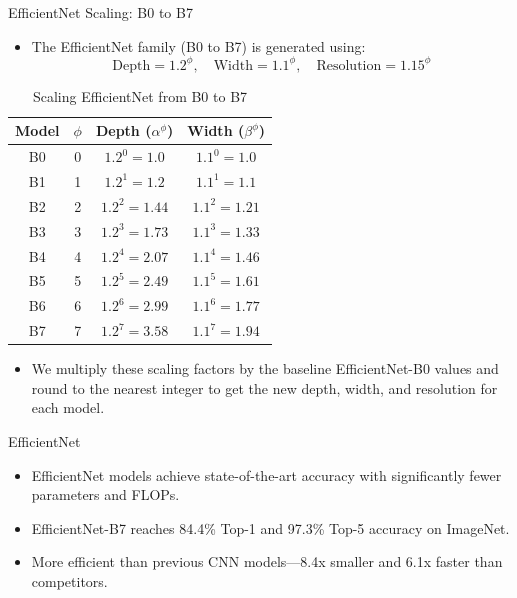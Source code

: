 \documentclass[10pt]{beamer}
\theoremstyle{remark}
\theoremstyle{definition}
\begin{document}
\begin{frame}{EfficientNet Scaling: B0 to B7}
\begin{itemize}
    \item The EfficientNet family (B0 to B7) is generated using:
    \[
    \text{Depth} = 1.2^\phi, \quad
    \text{Width} = 1.1^\phi, \quad
    \text{Resolution} = 1.15^\phi
    \]
\end{itemize}

\begin{table}[]
    \centering
    \begin{tabular}{|c|c|c|c|}
        \hline
        \textbf{Model} & \(\phi\) & \textbf{Depth} (\(\alpha^\phi\)) & \textbf{Width} (\(\beta^\phi\)) \\ 
        \hline
        B0 & 0 & \(1.2^0 = 1.0\) & \(1.1^0 = 1.0\)  \\ 
        B1 & 1 & \(1.2^1 = 1.2\) & \(1.1^1 = 1.1\)  \\ 
        B2 & 2 & \(1.2^2 = 1.44\) & \(1.1^2 = 1.21\)  \\ 
        B3 & 3 & \(1.2^3 = 1.73\) & \(1.1^3 = 1.33\)  \\ 
        B4 & 4 & \(1.2^4 = 2.07\) & \(1.1^4 = 1.46\)  \\ 
        B5 & 5 & \(1.2^5 = 2.49\) & \(1.1^5 = 1.61\)  \\ 
        B6 & 6 & \(1.2^6 = 2.99\) & \(1.1^6 = 1.77\)  \\ 
        B7 & 7 & \(1.2^7 = 3.58\) & \(1.1^7 = 1.94\)  \\ 
        \hline
    \end{tabular}
    \caption{Scaling EfficientNet from B0 to B7}
\end{table}

\begin{itemize}
\item We multiply these scaling factors by the baseline EfficientNet-B0 values and round to the nearest integer to get the new depth, width, and resolution for each model.
\end{itemize}


\end{frame}


\begin{frame}{EfficientNet}

\begin{itemize}
    \item EfficientNet models achieve state-of-the-art accuracy with significantly fewer parameters and FLOPs.        \pause

    \item EfficientNet-B7 reaches 84.4\% Top-1 and 97.3\% Top-5 accuracy on ImageNet.
    \pause

    \item More efficient than previous CNN models---8.4x smaller and 6.1x faster than competitors.
\end{itemize}
\end{frame}
\end{document}
